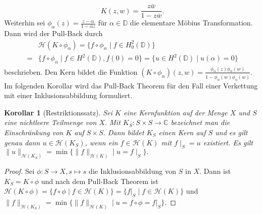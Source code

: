 \documentclass[12pt,titlepage,twoside,cleardoublepage]{article}
\theoremstyle{nummermitklammern}
\newtheorem{korollar}[temp]{Korollar}
\numberwithin{equation}{section}
\newtheorem{korollar}[zahl]{Korollar}
\begin{document}
\[
K(z,w)=\frac{z\bar{w}}{1-z\bar{w}}.
\]
Weiterhin sei $\phi_{\alpha}(z)=\frac{z-\alpha}{1-\bar{\alpha}z}$ für $\alpha\in \mathbb{D}$ die elementare Möbius Transformation. Dann wird der Pull-Back durch 
\begin{align*}
&\mathcal{H}(K\circ \phi_{\alpha})=\{f \circ \phi_{\alpha} \mid f \in H_0^2(\mathbb{D}) \}\\
=&\{f\circ \phi_{\alpha} \mid f\in H^2(\mathbb{D}),f(0)=0\}
=\{u\in H^2(\mathbb{D})\mid u(\alpha)=0\} 
\end{align*}
beschrieben. Den Kern bildet die Funktion $(K\circ\phi_{\alpha})(z,w) =\frac{\phi_{\alpha}(z)\overline{\phi_{\alpha}(w)}}{1-\overline{\phi_\alpha(w)}\phi_\alpha(w)}.$\\
Im folgenden Korollar wird das Pull-Back Theorem für den Fall einer Verkettung mit einer Inklusionsabbildung formuliert.
\begin{korollar}[Restriktionssatz]
Sei $K$ eine Kernfunktion auf der Menge $X$ und $S$ eine nichtleere Teilmenge von $X.$ Mit $K_S:S\times S\to \mathbb{C}$ bezeichnet man die Einschränkung von $K$ auf $S\times S.$ Dann bildet $K_S$ einen Kern auf $S$ und es gilt genau dann $u\in \mathcal{H}(K_S)$, wenn ein $f\in\mathcal{H}(K)$ mit $f\mid_{S}=u$ existiert.  Es gilt $\|u\|_{\mathcal{H}(K_S)}=\min\{\|f\|_{\mathcal{H}(K)}\mid u=f\mid_{S}\}.$
\end{korollar}
\begin{proof}
Sei $\phi:S\to X,s\mapsto s$ die Inklusionsabbildung von $S$ in $X$. Dann ist $K_S=K\circ \phi$ und nach dem Pull-Back Theorem ist $\mathcal{H}(K\circ \phi)=\{f\circ \phi \mid f\in \mathcal{H}(K)\}=\{f\vert_S \mid f\in \mathcal{H}(K)\}$ und $\|f\|_{\mathcal{H}(K_S)}=\min\{\|f\|_{\mathcal{H}(K)}\mid u=f\circ \phi=f\vert_S\}.$
\end{proof}
\end{document}
